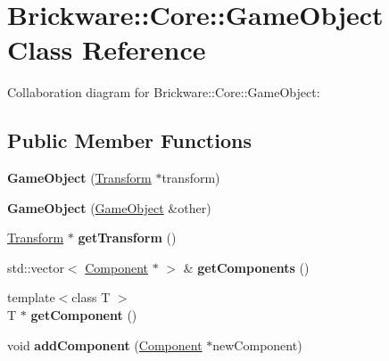 \hypertarget{classBrickware_1_1Core_1_1GameObject}{}\section{Brickware\+:\+:Core\+:\+:Game\+Object Class Reference}
\label{classBrickware_1_1Core_1_1GameObject}


Collaboration diagram for Brickware\+:\+:Core\+:\+:Game\+Object\+:
\subsection*{Public Member Functions}
\begin{DoxyCompactItemize}
\item 
\hypertarget{classBrickware_1_1Core_1_1GameObject_ab4af1c776194503e71c574b256e5e2b9}{}{\bfseries Game\+Object} (\hyperlink{classBrickware_1_1Core_1_1Transform}{Transform} $\ast$transform)\label{classBrickware_1_1Core_1_1GameObject_ab4af1c776194503e71c574b256e5e2b9}

\item 
\hypertarget{classBrickware_1_1Core_1_1GameObject_ae81f5595a320da723c9eda8f72e5ef07}{}{\bfseries Game\+Object} (\hyperlink{classBrickware_1_1Core_1_1GameObject}{Game\+Object} \&other)\label{classBrickware_1_1Core_1_1GameObject_ae81f5595a320da723c9eda8f72e5ef07}

\item 
\hypertarget{classBrickware_1_1Core_1_1GameObject_ac0a011ab2131a74cb29d288d7529fd03}{}\hyperlink{classBrickware_1_1Core_1_1Transform}{Transform} $\ast$ {\bfseries get\+Transform} ()\label{classBrickware_1_1Core_1_1GameObject_ac0a011ab2131a74cb29d288d7529fd03}

\item 
\hypertarget{classBrickware_1_1Core_1_1GameObject_a4e938e9c9ea60147655ec2be3c5f2c74}{}std\+::vector$<$ \hyperlink{classBrickware_1_1Core_1_1Component}{Component} $\ast$ $>$ \& {\bfseries get\+Components} ()\label{classBrickware_1_1Core_1_1GameObject_a4e938e9c9ea60147655ec2be3c5f2c74}

\item 
\hypertarget{classBrickware_1_1Core_1_1GameObject_a7c74fd062540820f6766fca8409b613b}{}{\footnotesize template$<$class T $>$ }\\T $\ast$ {\bfseries get\+Component} ()\label{classBrickware_1_1Core_1_1GameObject_a7c74fd062540820f6766fca8409b613b}

\item 
\hypertarget{classBrickware_1_1Core_1_1GameObject_a971dddb1ed949e036ffff02689b2f797}{}void {\bfseries add\+Component} (\hyperlink{classBrickware_1_1Core_1_1Component}{Component} $\ast$new\+Component)\label{classBrickware_1_1Core_1_1GameObject_a971dddb1ed949e036ffff02689b2f797}


\end{DoxyCompactItemize}
